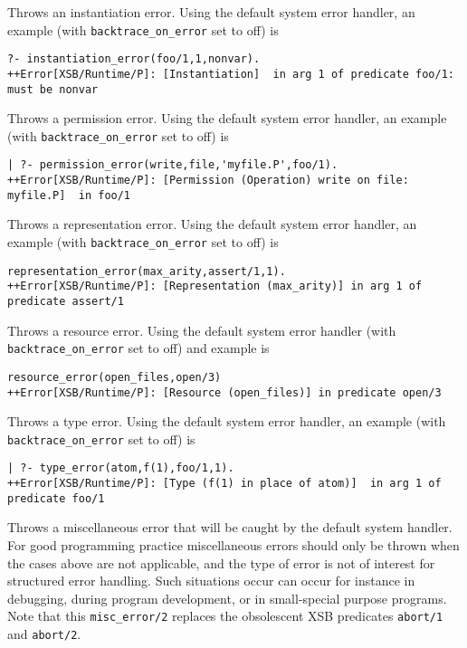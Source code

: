 \begin{description}
%
Throws an instantiation error.  Using the default system error
handler, an example (with {\tt backtrace\_on\_error} set to off) is 
{\small 
\begin{verbatim}
?- instantiation_error(foo/1,1,nonvar).
++Error[XSB/Runtime/P]: [Instantiation]  in arg 1 of predicate foo/1: must be nonvar
\end{verbatim}
}
%
%
Throws a permission error.  Using the default system error
handler, an example (with {\tt backtrace\_on\_error} set to off) is 
{\small 
\begin{verbatim}
| ?- permission_error(write,file,'myfile.P',foo/1).
++Error[XSB/Runtime/P]: [Permission (Operation) write on file: myfile.P]  in foo/1
\end{verbatim}
}
%
% 
Throws a representation error.  Using the default system error handler, an
example (with {\tt backtrace\_on\_error} set to off) is {\small
\begin{verbatim}
representation_error(max_arity,assert/1,1).
++Error[XSB/Runtime/P]: [Representation (max_arity)] in arg 1 of predicate assert/1
\end{verbatim} }
%
%
Throws a resource error.  Using the default system error handler
(with {\tt backtrace\_on\_error} set to off) and example is {\small
\begin{verbatim}
resource_error(open_files,open/3)
++Error[XSB/Runtime/P]: [Resource (open_files)] in predicate open/3
\end{verbatim} }
%
%
Throws a type error.  Using the default system error
handler, an example (with {\tt backtrace\_on\_error} set to off) is 
{\small 
\begin{verbatim}
| ?- type_error(atom,f(1),foo/1,1).
++Error[XSB/Runtime/P]: [Type (f(1) in place of atom)]  in arg 1 of predicate foo/1
\end{verbatim}
}
%
%
Throws a miscellaneous error that will
be caught by the default system handler.  For good programming
practice miscellaneous errors should only be thrown when the cases
above are not applicable, and the type of error is not of interest for
structured error handling.  Such situations occur can occur for
instance in debugging, during program development, or in small-special
purpose programs.  Note that this {\tt misc\_error/2} replaces the
obsolescent XSB predicates {\tt abort/1} and {\tt abort/2}.
%
\end{description}
